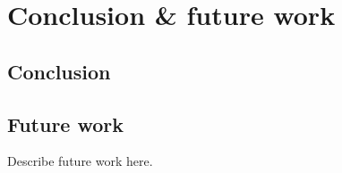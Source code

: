 \chapter{Conclusion \& future work}\label{ch:conclusion-future-work}

\section{Conclusion}\label{sec:conclusion}

\section{Future work}\label{sec:future-work}
Describe future work here.